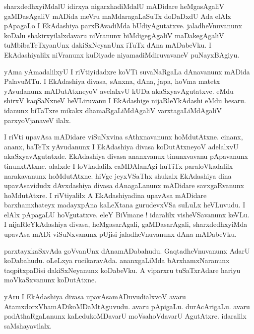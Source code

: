 \documentclass{article}
\begin{document}
\begin{mn}%
sharxdedhxyiMdalU idirxya nigarxhadiMdalU mADidare heMgasAgaliV gaMDasAgaliV mADida meVru 
maMdaragaLaSuTx doDaDxdU Ada elAlx pApagaLo I EkAdashiya parxBAvadiMda bUdiyAgutatxve. 
jaladheVnuvanunx koDalu shakirxyilalxdavaru niVranunx biMdigegAgaliV maDakegAgaliV 
tuMbibaTeTxyanUnx dakiSxNeyanUnx iTuTx dAna mADabeVku. I EkAdashiyalilx niVranunx kuDiyade 
niyamadiMdiruvavaneV puNayxBAgiyu.
\end{mn}

\begin{mn}%
yAma yAmadalilxyU I riVtiyidadxre koVTi suvaNaRgaLa dAnavanunx mADida PalavuMTu. I EkAdashiya 
divasa, sAnxna, dAna, japa, hoVma matetx yAvudanunx mADutAtxneyoV avelalxvU kUDa 
akaSxyavAgutatxve. eMdu shirxV kaqSaNxneV heVLiruvanu I EkAdashige nijaRleYkAdashi eMdu hesaru. 
idanunx biTaTxre mikakx dhamaRgaLiMdAgaliV varxtagaLiMdAgaliV parxyoVjanaveV ilalx.
\end{mn}

\begin{mn}%
I riVti upavAsa mADidare viSuNxvina sAthxnavanunx hoMdutAtxne. cinanx, ananx, baTeTx yAvudanunx I 
EkAdashiya divasa koDutAtxneyoV adelalxvU akaSxyavAgutatxde. EkAdashiya divasa ananxvanux 
tinunxvavanu pApavanunx tinunxtAtxne. alalxde I loVkadalilx caMDAlanAgi huTiTx paraloVkadalilx 
narakavanunx hoMdutAtxne. hiVge jeyxVSaThx shukalx EkAdashiya dina upavAsavidudx dAvxdashiya 
divasa dAnagaLanunx mADidare savxgaRvanunx hoMdutAtxre. I riVtiyalilx A EkAdashiyadina upavAsa 
mADidare barxhamxhateyx madayxpAna kaLeXtana gurudevxVSa suLuLx heVLuvudu. I elAlx pApagaLU 
hoVgutatxve. eleY BiVmane ! idaralilx visheVSavanunx keVLu. I nijaRleYkAdashiya divasa, 
heMgasarAgali, gaMDasarAgali, sharxdedhxyiMda upavAsa mADi viSuNxvanunx pUjisi jaladheVnuvanunx 
dAna mADabeVku.
\end{mn}

\begin{mn}%
parxtayxkaSxvAda goVvanUnx dAnamADabahudu. GaqtadheVnuvanunx AdarU koDabahudu. oLeLxya 
rucikaravAda. ananxgaLiMda bArxhamxNaranunx taqpitxpaDisi dakiSxNeyanunx koDabeVku. A viparxru 
tuSaTxrAdare hariyu moVkaSxvanunx koDutAtxne.
\end{mn}

\begin{mn}%
yAru I EkAdashiya divasa upavAsamADuvudialxvoV avaru AtamxdorxVhamADikoMDaMtAguvudu. avaru 
pApigaLu. durAcArigaLu. avaru padAthaRgaLanunx kaLedukoMDavarU moVsahoVdavarU AgutAtxre. idaralilx 
saMshayavilalx.
\end{mn}
\end{document}

